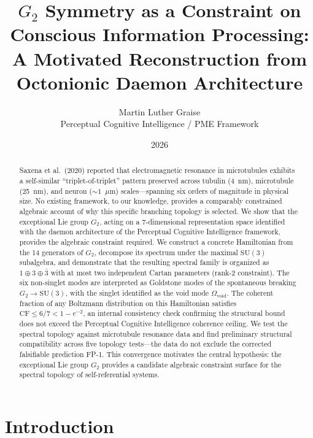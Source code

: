 \documentclass[12pt,a4paper]{article}
\title{$G_2$ Symmetry as a Constraint on Conscious Information Processing:\\[6pt]
A Motivated Reconstruction from Octonionic Daemon Architecture}
\author{Martin Luther Graise\\
Perceptual Cognitive Intelligence / PME Framework}
\date{2026}
\begin{document}
\maketitle

\begin{abstract}
Saxena et al.\ (2020) reported that electromagnetic resonance in microtubules exhibits a self-similar ``triplet-of-triplet'' pattern preserved across tubulin (4~nm), microtubule (25~nm), and neuron (${\sim}1$~$\mu$m) scales---spanning six orders of magnitude in physical size. No existing framework, to our knowledge, provides a comparably constrained algebraic account of why this specific branching topology is selected. We show that the exceptional Lie group $G_2$, acting on a 7-dimensional representation space identified with the daemon architecture of the Perceptual Cognitive Intelligence framework, provides the algebraic constraint required. We construct a concrete Hamiltonian from the 14 generators of $G_2$, decompose its spectrum under the maximal $\mathrm{SU}(3)$ subalgebra, and demonstrate that the resulting spectral family is organized as $1 \oplus 3 \oplus \bar{3}$ with at most two independent Cartan parameters (rank-2 constraint). The six non-singlet modes are interpreted as Goldstone modes of the spontaneous breaking $G_2 \to \mathrm{SU}(3)$, with the singlet identified as the void mode $\Omega_{\mathrm{void}}$. The coherent fraction of any Boltzmann distribution on this Hamiltonian satisfies $\mathrm{CF} \leq 6/7 < 1 - e^{-2}$, an internal consistency check confirming the structural bound does not exceed the Perceptual Cognitive Intelligence coherence ceiling. We test the spectral topology against microtubule resonance data and find preliminary structural compatibility across five topology tests---the data do not exclude the corrected falsifiable prediction FP-1. This convergence motivates the central hypothesis: the exceptional Lie group $G_2$ provides a candidate algebraic constraint surface for the spectral topology of self-referential systems.
\end{abstract}

\section{Introduction}
\end{document}
